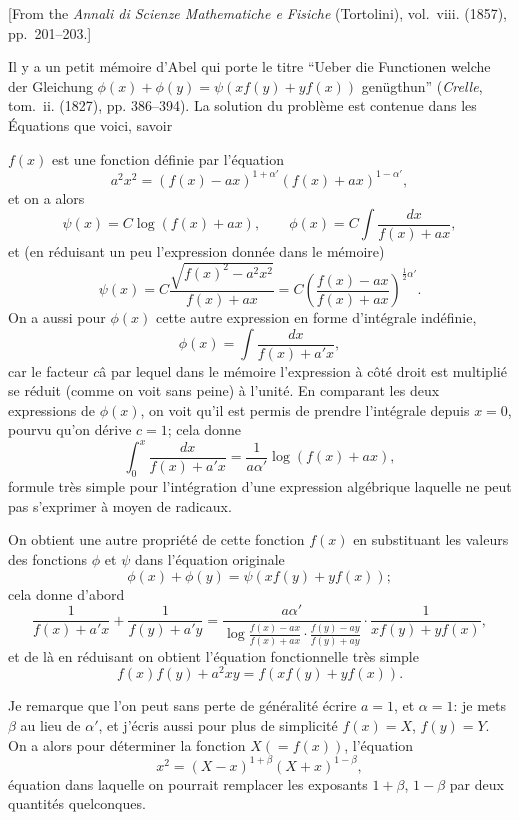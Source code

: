 \documentclass[11pt,a4paper]{book}
\begin{document}
\begin{center}
\small
[From the \textit{Annali di Scienze Mathematiche e Fisiche} (Tortolini), vol.~viii. (1857), pp.~201--203.]
\end{center}

\bigskip

Il y a un petit m\'{e}moire d'Abel qui porte le titre ``Ueber die Functionen welche der Gleichung $\phi(x)+\phi(y)=\psi(xf(y)+yf(x))$ gen\"{u}gthun'' (\textit{Crelle}, tom.~ii. (1827), pp. 386--394). La solution du probl\`{e}me est contenue dans les \'{E}quations que voici, savoir

$f(x)$ est une fonction d\'{e}finie par l'\'{e}quation
\[
a^2x^2=(f(x)-ax)^{1+\alpha'}(f(x)+ax)^{1-\alpha'},
\]
et on a alors
\[
\psi(x)=C\log(f(x)+ax),\qquad \phi(x)=C\int\frac{dx}{f(x)+ax},
\]
et (en r\'{e}duisant un peu l'expression donn\'{e}e dans le m\'{e}moire)
\[
\psi(x)=C\frac{\sqrt{f(x)^2-a^2x^2}}{f(x)+ax}
=C\left(\frac{f(x)-ax}{f(x)+ax}\right)^{\frac{1}{2}\alpha'}.
\]
On a aussi pour $\phi(x)$ cette autre expression en forme d'int\'{e}grale ind\'{e}finie,
\[
\phi(x)=\int\frac{dx}{f(x)+a'x},
\]
car le facteur $c$\^{a} par lequel dans le m\'{e}moire l'expression \`{a} c\^{o}t\'{e} droit est multipli\'{e} se r\'{e}duit (comme on voit sans peine) \`{a} l'unit\'{e}. En comparant les deux expressions de $\phi(x)$, on voit qu'il est permis de prendre l'int\'{e}grale depuis $x=0$, pourvu qu'on d\'{e}rive $c=1$; cela donne
\[
\int_0^x\frac{dx}{f(x)+a'x}=\frac{1}{a\alpha'}\log(f(x)+ax),
\]
formule tr\`{e}s simple pour l'int\'{e}gration d'une expression alg\'{e}brique laquelle ne peut pas s'exprimer \`{a} moyen de radicaux.

On obtient une autre propri\'{e}t\'{e} de cette fonction $f(x)$ en substituant les valeurs des fonctions $\phi$ et $\psi$ dans l'\'{e}quation originale
\[
\phi(x)+\phi(y)=\psi(xf(y)+yf(x));
\]
cela donne d'abord
\[
\frac{1}{f(x)+a'x}+\frac{1}{f(y)+a'y}
=\frac{a\alpha'}{\log\frac{f(x)-ax}{f(x)+ax}\cdot\frac{f(y)-ay}{f(y)+ay}}
\cdot\frac{1}{xf(y)+yf(x)},
\]
et de l\`{a} en r\'{e}duisant on obtient l'\'{e}quation fonctionnelle tr\`{e}s simple
\[
f(x)f(y)+a^2xy=f(xf(y)+yf(x)).
\]

Je remarque que l'on peut sans perte de g\'{e}n\'{e}ralit\'{e} \'{e}crire $a=1$, et $\alpha=1$: je mets $\beta$ au lieu de $\alpha'$, et j'\'{e}cris aussi pour plus de simplicit\'{e} $f(x)=X$, $f(y)=Y$. On a alors pour d\'{e}terminer la fonction $X(=f(x))$, l'\'{e}quation
\[
x^2=(X-x)^{1+\beta}(X+x)^{1-\beta},
\]
\'{e}quation dans laquelle on pourrait remplacer les exposants $1+\beta$, $1-\beta$ par deux quantit\'{e}s quelconques.
\end{document}
